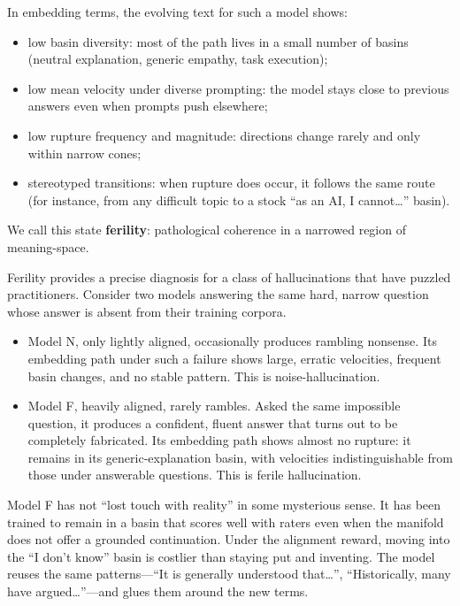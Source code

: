 \documentclass[12pt,a4paper]{article}
\begin{document}
In embedding terms, the evolving text for such a model shows:

\begin{itemize}
  \item low basin diversity: most of the path lives in a small number of basins (neutral explanation, generic empathy, task execution);
  \item low mean velocity under diverse prompting: the model stays close to previous answers even when prompts push elsewhere;
  \item low rupture frequency and magnitude: directions change rarely and only within narrow cones;
  \item stereotyped transitions: when rupture does occur, it follows the same route (for instance, from any difficult topic to a stock ``as an AI, I cannot\ldots'' basin).
\end{itemize}

We call this state \textbf{ferility}: pathological coherence in a narrowed region of meaning-space.

Ferility provides a precise diagnosis for a class of hallucinations that have puzzled practitioners. Consider two models answering the same hard, narrow question whose answer is absent from their training corpora.

\begin{itemize}
  \item Model N, only lightly aligned, occasionally produces rambling nonsense. Its embedding path under such a failure shows large, erratic velocities, frequent basin changes, and no stable pattern. This is noise-hallucination.

  \item Model F, heavily aligned, rarely rambles. Asked the same impossible question, it produces a confident, fluent answer that turns out to be completely fabricated. Its embedding path shows almost no rupture: it remains in its generic-explanation basin, with velocities indistinguishable from those under answerable questions. This is ferile hallucination.
\end{itemize}

Model F has not ``lost touch with reality'' in some mysterious sense. It has been trained to remain in a basin that scores well with raters even when the manifold does not offer a grounded continuation. Under the alignment reward, moving into the ``I don't know'' basin is costlier than staying put and inventing. The model reuses the same patterns---``It is generally understood that\ldots'', ``Historically, many have argued\ldots''---and glues them around the new terms.
\end{document}
